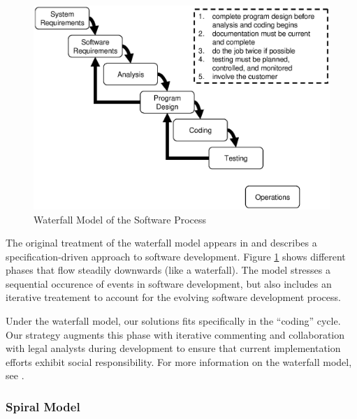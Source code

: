 \begin{figure}
\begin{center}
\includegraphics[scale=0.66]{images/waterfall.eps}
\end{center}
\caption{Waterfall Model of the Software Process}
\label{fig:waterfall}
\end{figure}

The original treatment of the waterfall model appears in \cite{Royce1970} and
describes a specification-driven approach to software development. Figure
\ref{fig:waterfall} shows different phases that flow steadily downwards (like a
waterfall). The model stresses a sequential occurence of events in software
development, but also includes an iterative treatement to account for the
evolving software development process.

Under the waterfall model, our solutions fits specifically in the ``coding''
cycle. Our strategy augments this phase with iterative commenting and
collaboration with legal analysts during development to ensure that current
implementation efforts exhibit social responsibility. For more information on
the waterfall model, see \cite{Royce1970}.

\subsubsection{Spiral Model}\label{spiral}

